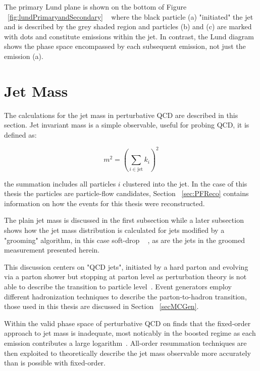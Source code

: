 The primary Lund plane is shown on the bottom of Figure ~\ref{fig:lundPrimaryandSecondary} ~\cite{Dreyer:2018nbf} where the black particle (a) "initiated" the jet and is described by the grey shaded region and particles (b) and (c) are marked with dots and constitute emissions within the jet. In contrast, the Lund diagram shows the phase space encompassed by each subsequent emission, not just the emission (a).~\cite{Dreyer:2018nbf}






\section{Jet Mass}\label{sec:jetmass}


The calculations for the jet mass in perturbative QCD are described in this section. Jet invariant mass is a simple observable, useful for probing QCD, it is defined as:\newline

\begin{equation}
m^{2}=\left(\sum_{i \in \mathrm{jet}} k_{i}\right)^{2}
\end{equation}

the summation includes all particles $i$ clustered into the jet. In the case of this thesis the particles are particle-flow candidates, Section ~\ref{sec:PFReco} contains information on how the events for this thesis were reconstructed.

The plain jet mass is discussed in the first subsection while a later subsection shows how the jet mass distribution is calculated for jets modified by a "grooming" algorithm, in this case soft-drop ~\cite{softdrop} , as are the jets in the groomed measurement presented herein.

This discussion centers on "QCD jets", initiated by a hard parton and evolving via a parton shower but stopping at parton level as perturbation theory is not able to describe the transition to particle level~\cite{Marzani:2019hun}. Event generators employ different hadronization techniques to describe the parton-to-hadron transition, those used in this thesis are discussed in Section ~\ref{secMCGen}.

Within the valid phase space of perturbative QCD on finds that the fixed-order approach to jet mass is inadequate, most noticably in the boosted regime as each emission contributes a large logarithm~\cite{Marzani:2019hun}. All-order resummation techniques are then exploited to theoretically describe the jet mass observable more accurately than is possible with fixed-order. 



